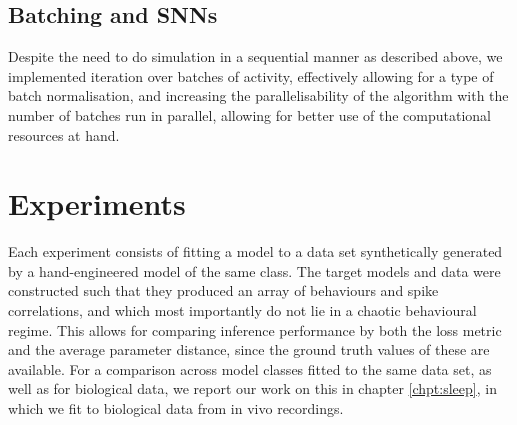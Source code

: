 \documentclass[mphil,deptreport,ianc]{infthesis} %
\begin{document}



\subsection{Batching and SNNs}

Despite the need to do simulation in a sequential manner as described above, we implemented iteration over batches of activity, effectively allowing for a type of batch normalisation, and increasing the parallelisability of the algorithm with the number of batches run in parallel, allowing for better use of the computational resources at hand.


\section{Experiments}

Each experiment consists of fitting a model to a data set synthetically generated by a hand-engineered model of the same class.
The target models and data were constructed such that they produced an array of behaviours and spike correlations, and which most importantly do not lie in a chaotic behavioural regime.
This allows for comparing inference performance by both the loss metric and the average parameter distance, since the ground truth values of these are available.
For a comparison across model classes fitted to the same data set, as well as for biological data, we report our work on this in chapter \ref{chpt:sleep}, in which we fit to biological data from in vivo recordings.

\end{document}
